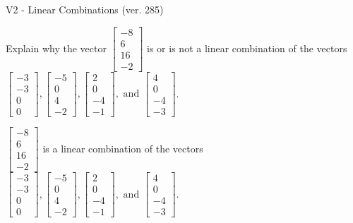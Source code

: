 \begin{exercise}
  \begin{exerciseTitle}V2 - Linear Combinations (ver. 285)\end{exerciseTitle}
  \begin{exerciseStatement}
    Explain why the vector \(\left[\begin{array}{c}
-8 \\
6 \\
16 \\
-2
\end{array}\right]\)  is or is not a linear 
	combination of the vectors \(\left[\begin{array}{c}
-3 \\
-3 \\
0 \\
0
\end{array}\right] , \left[\begin{array}{c}
-5 \\
0 \\
4 \\
-2
\end{array}\right] , \left[\begin{array}{c}
2 \\
0 \\
-4 \\
-1
\end{array}\right] , \text{ and } \left[\begin{array}{c}
4 \\
0 \\
-4 \\
-3
\end{array}\right]\).
	


  \end{exerciseStatement}
  \begin{exerciseAnswer}
   \(\left[\begin{array}{c}
-8 \\
6 \\
16 \\
-2
\end{array}\right]\) 
  	 is  
	a linear combination of the vectors \(\left[\begin{array}{c}
-3 \\
-3 \\
0 \\
0
\end{array}\right] , \left[\begin{array}{c}
-5 \\
0 \\
4 \\
-2
\end{array}\right] , \left[\begin{array}{c}
2 \\
0 \\
-4 \\
-1
\end{array}\right] , \text{ and } \left[\begin{array}{c}
4 \\
0 \\
-4 \\
-3
\end{array}\right]\).


\end{exerciseAnswer}
\end{exercise}
